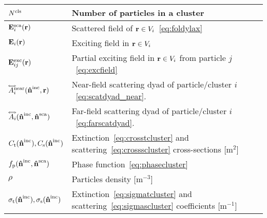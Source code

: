 \begin{table}[h!]
\begin{tabular}{ll}
        ${N^\text{cls}}$ & Number of particles in a cluster \\
        \hline
        $\mathbf{E}^\text{sca}_i(\mathbf{r})$ & Scattered field of $\mathbf{r}\in V_i$~\eqref{eq:foldylax}\\
        $\mathbf{E}_i(\mathbf{r})$ & Exciting field in $\mathbf{r}\in V_i$ \\
        $\mathbf{E}^\text{exc}_{ij}(\mathbf{r})$ & Partial exciting field in $\mathbf{r}\in V_i$ from particle $j$~\eqref{eq:excfield} \\
        $\accentset{\Longleftrightarrow}{A}_i^\text{near}(\mathbf{\hat{n}}^{\text{inc}},\mathbf{r})$ & Near-field scattering dyad of particle/cluster $i$~\eqref{eq:scatdyad_near}. \\
        $\accentset{\Longleftrightarrow}{A}_i(\mathbf{\hat{n}}^{\text{inc}},\mathbf{\hat{n}}^{\text{sca}})$ & Far-field scattering dyad of particle/cluster $i$~\eqref{eq:farscatdyad}. \\
        \hline
        \hline
        $C_\mathrm{t}(\mathbf{\hat{n}}^{\text{inc}}),C_\mathrm{s}(\mathbf{\hat{n}}^{\text{inc}})$ & Extinction~\eqref{eq:crosstcluster} and scattering~\eqref{eq:crossscluster} cross-sections [m$^{2}$]\\
        $f_\mathrm{p}(\mathbf{\hat{n}}^{\text{inc}},\mathbf{\hat{n}}^{\text{sca}})$ & Phase function~\eqref{eq:phasecluster}\\
        $\rho$ & Particles density [m$^{-3}$] \\
        $\sigma_\mathrm{t}(\mathbf{\hat{n}}^{\text{inc}}),\sigma_\mathrm{s}(\mathbf{\hat{n}}^{\text{inc}})$ & Extinction~\eqref{eq:sigmatcluster} and scattering~\eqref{eq:sigmascluster} coefficients [m$^{-1}$]
    \end{tabular}
\end{table}